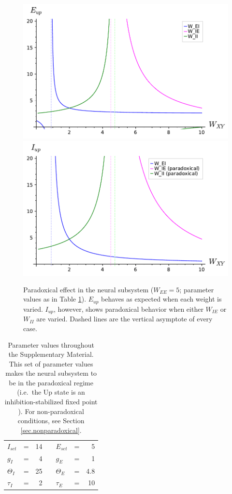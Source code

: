 \documentclass[twocolumn]{article}
\newcommand{\EE}{\mathit{EE}}
\newcommand{\IE}{\mathit{IE}}
\newcommand{\II}{\mathit{II}}
\newcommand{\set}{\mathit{set}}
\newcommand{\up}{\mathit{up}}
\begin{document}
\begin{figure}[!ht]
\centering
\includegraphics[width=\linewidth]{paradoxical_E}
\includegraphics[width=\linewidth]{paradoxical_I}
\caption{Paradoxical effect in the neural subsystem ($W_{\EE}=5$; parameter values as in Table \ref{tab.params}). $E_{\up}$ behaves as expected when each weight is varied. $I_{\up}$, however, shows paradoxical behavior when either $W_{\IE}$ or $W_{\II}$ are varied. Dashed lines are the vertical asymptote of every case.}
\label{fig.paradoxical}
\end{figure}



\begin{table}[ht]
\centering
\begin{tabular}{lcrclcr}
$I_{\set}$ & = & 14 & \hspace{1cm} & $E_{\set}$ & = & 5 \\
$g_I$ & = & 4 & & $g_E$ & = & 1 \\
$\Theta_I$ & = & 25 & & $\Theta_E$ & = & 4.8 \\
$\tau_I$ & = & 2 & & $\tau_E$ & = & 10
\end{tabular}
\caption{Parameter values throughout the Supplementary Material. This set of parameter values makes the neural subsystem to be in the paradoxical regime (i.e.\ the Up state is an inhibition-stabilized fixed point \cite{Sadeh2021}). For non-paradoxical conditions, see Section \ref{sec.nonparadoxical}.}
\label{tab.params}
\end{table}
\end{document}
